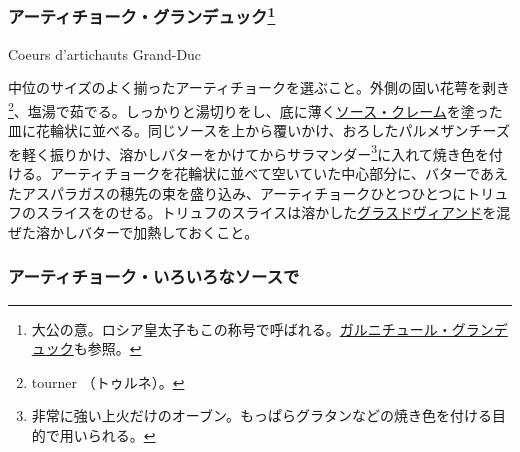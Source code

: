 \begin{recette}
\hypertarget{coeurs-d-artichauts-grand-duc}{%
\subsubsection[アーティチョーク・グランデュック]{\texorpdfstring{アーティチョーク・グランデュック\footnote{大公の意。ロシア皇太子もこの称号で呼ばれる。\href{garniture-grand-duc}{ガルニチュール・グランデュック}も参照。}}{アーティチョーク・グランデュック}}\label{coeurs-d-artichauts-grand-duc}}

\begin{frsubenv}

Coeurs d'artichauts Grand-Duc

\end{frsubenv}


中位のサイズのよく揃ったアーティチョークを選ぶこと。外側の固い花萼を剥き\footnote{tourner
  （トゥルネ）。}、塩湯で茹でる。しっかりと湯切りをし、底に薄く\protect\hyperlink{sauce-creme}{ソース・クレーム}を塗った皿に花輪状に並べる。同じソースを上から覆いかけ、おろしたパルメザンチーズを軽く振りかけ、溶かしバターをかけてからサラマンダー\footnote{非常に強い上火だけのオーブン。もっぱらグラタンなどの焼き色を付ける目的で用いられる。}に入れて焼き色を付ける。アーティチョークを花輪状に並べて空いていた中心部分に、バターであえたアスパラガスの穂先の束を盛り込み、アーティチョークひとつひとつにトリュフのスライスをのせる。トリュフのスライスは溶かした\protect\hyperlink{glace-de-viande}{グラスドヴィアンド}を混ぜた溶かしバターで加熱しておくこと。

\atoaki{}

\hypertarget{artichauts-avec-sauce-diverses}{%
\subsubsection{アーティチョーク・いろいろなソースで}\label{artichauts-avec-sauce-diverses}}

\begin{frsubenv}


\end{frsubenv}
\end{recette}

